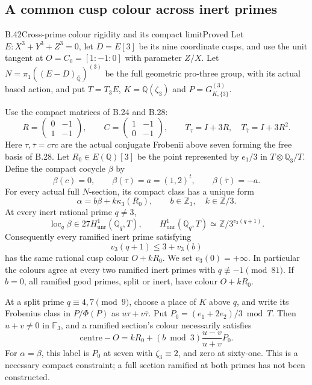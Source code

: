 \subsection{A common cusp colour across inert primes}

\begin{statement}{B.42}{Cross-prime colour rigidity and its compact limit}{Proved}
Let $E:X^3+Y^3+Z^3=0$, let $D=E[3]$ be its nine coordinate
cusps, and use the unit tangent at $O=C_0=[1:-1:0]$ with
parameter $Z/X$.  Let $N=\pi_1((E-D)_{\overline{\mathbb Q}})^{(3)}$
be the full geometric pro-three group, with its actual based action,
and put $T=T_3E$, $K=\mathbb Q(\zeta_3)$ and
$P=G_{K,\{3\}}^{(3)}$.

Use the compact matrices of B.24 and B.28:
\[
 R=\begin{pmatrix}0&-1\\1&-1\end{pmatrix},\qquad
 C=\begin{pmatrix}1&-1\\0&-1\end{pmatrix},\qquad
 T_\tau=I+3R,\quad T_{\bar\tau}=I+3R^2.
                                                               \tag{B.42.1}
\]
Here $\tau,\bar\tau=c\tau c$ are the actual conjugate Frobenii
above seven forming the free basis of B.28.  Let $R_0\in E(\mathbb Q)[3]$
be the point represented by $e_1/3$ in $T\otimes\mathbb Q_3/T$.
Define the compact cocycle $\beta$ by
\[
 \beta(c)=0,\qquad \beta(\tau)=a=(1,2)^t,
 \qquad\beta(\bar\tau)=-a.
                                                               \tag{B.42.2}
\]
For every actual full $N$-section, its compact class has a unique form
\[
 \alpha=b\beta+k\kappa_3(R_0),\qquad
 b\in\mathbb Z_3,\quad k\in\mathbb Z/3.
                                                               \tag{B.42.3}
\]
At every inert rational prime $q\ne3$,
\[
 \operatorname{loc}_q\beta
 \in27H^1_{\mathrm{unr}}(\mathbb Q_q,T),\qquad
 H^1_{\mathrm{unr}}(\mathbb Q_q,T)\simeq
       \mathbb Z/3^{v_3(q+1)}.
                                                               \tag{B.42.4}
\]
Consequently every ramified inert prime satisfying
\[
                 v_3(q+1)\le3+v_3(b)                         \tag{B.42.5}
\]
has the same rational cusp colour $O+kR_0$.  We set $v_3(0)=+\infty$.
In particular the colours agree at every two ramified inert primes
with $q\not\equiv-1\pmod{81}$.  If $b=0$, all ramified good
primes, split or inert, have colour $O+kR_0$.

At a split prime $q\equiv4,7\pmod9$, choose a place of $K$
above $q$, and write its Frobenius class in $P/\Phi(P)$ as
$u\tau+v\bar\tau$.  Put $P_0=(e_1+2e_2)/3\bmod T$.
Then $u+v\ne0$ in $\mathbb F_3$, and a ramified section's
colour necessarily satisfies
\[
 \text{centre}-O=kR_0+(b\bmod3)\frac{u-v}{u+v}P_0.
\]
For $\alpha=\beta$, this label is $P_0$ at seven with
$\zeta_3\equiv2$, and zero at sixty-one.  This is a necessary
compact constraint; a full section ramified at both primes has
not been constructed.


\end{statement}
